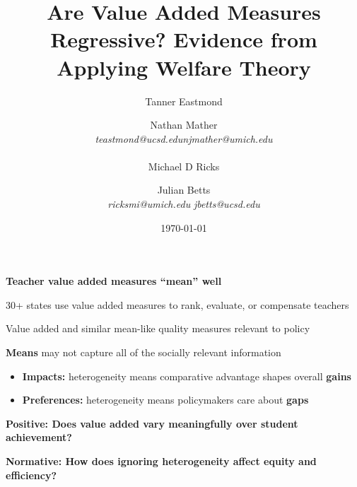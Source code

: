 \documentclass[t,aspectratio=169,11pt,presentation]{beamer}
\title{Are Value Added Measures Regressive? Evidence from Applying Welfare Theory}
\author{Tanner Eastmond \hfill \and Nathan Mather    \\   \textit{teastmond@ucsd.edu}\hfill \textit{njmather{\fontfamily{qag}\selectfont @}umich.edu} \\ {\color{white}{t}} \\  Michael D Ricks  \and \hfill  Julian Betts \\
\textit{ricksmi{\fontfamily{qag}\selectfont @}umich.edu} \hfill \textit{jbetts@ucsd.edu}}
\institute{}
\date{\today}
\newenvironment{wideitemize}{\itemize\addtolength{\itemsep}{14pt}}{\enditemize}
\begin{document}
\begin{frame}[noframenumbering]
\titlepage 
\end{frame}



\begin{frame}{\textbf{Teacher value added measures ``mean'' well}}

\begin{wideitemize}
    \item 30+ states use value added measures to rank, evaluate, or compensate teachers
    
    \item<2-> Value added and similar mean-like quality measures relevant to policy
    
    \item <3->{\textbf{Means}} may not capture all of the socially relevant information
    \begin{itemize}
        \item<4-> {\textbf{Impacts:}} heterogeneity means comparative advantage shapes overall {\textbf{gains}}
        \item<5-> {\textbf{Preferences:}} heterogeneity means policymakers care about {\textbf{gaps}}
    \end{itemize}
    
    \item<6-> {\textbf{Positive: Does value added vary meaningfully over student achievement?}} 
  
    \item<7> {\textbf{Normative: How does ignoring heterogeneity affect equity and efficiency?}}
  
\end{wideitemize}
\end{frame}
\end{document}
